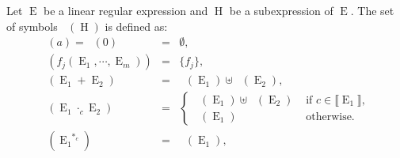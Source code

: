 \documentclass{llncs}
\DeclareMathOperator{\E}{E}
\DeclareMathOperator{\h}{H}
\DeclareMathOperator{\Fir}{Fr_>}
\def\firstt#1{\Fir{(#1)}}
\begin{document}
\begin{proposition}
\label{prop firstsup}
Let $\E$ be a linear regular expression and $\h$ be a subexpression of $\E$. The set of symbols $\firstt{\h}$ is defined as: 
\begin{eqnarray*}
\firstt{a}=\firstt{0}&=& \emptyset,\\
\firstt{f_j(\E_1, \cdots,\E_m)}&=&\lbrace f_j\rbrace,\\
\firstt{\E_1+\E_2}&=&\firstt{\E_1}\uplus\firstt{\E_2},\\
\firstt{{\E_1}\cdot_c \E_2}&=&\left\{
\begin{array}{ll}
\firstt{\E_1}\uplus\firstt{\E_2}&\mbox{ if } c\in\llbracket\E_1\rrbracket,\\
\firstt{\E_1}&\mbox{ otherwise.}
\end{array}\right.\\
\firstt{{\E_1}^{*_c}}&=&\firstt{\E_1},\\
\end{eqnarray*}
\end{proposition}
\end{document}
